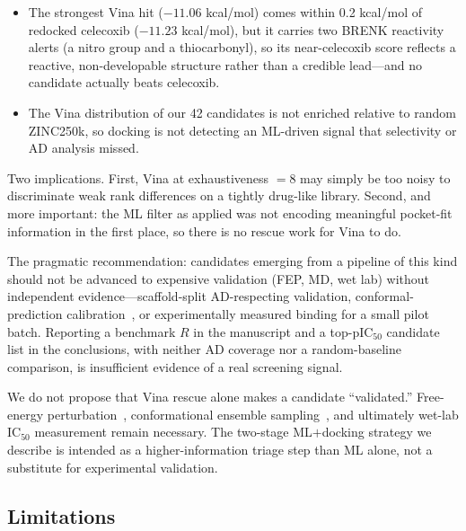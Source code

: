 \documentclass[11pt]{article}
\begin{document}
\begin{itemize}
\item The strongest Vina hit ($-11.06$ kcal/mol) comes within 0.2 kcal/mol of redocked celecoxib ($-11.23$ kcal/mol), but it carries two BRENK reactivity alerts (a nitro group and a thiocarbonyl), so its near-celecoxib score reflects a reactive, non-developable structure rather than a credible lead---and no candidate actually beats celecoxib.
\item The Vina distribution of our 42 candidates is not enriched relative to random ZINC250k, so docking is not detecting an ML-driven signal that selectivity or AD analysis missed.
\end{itemize}

Two implications. First, Vina at exhaustiveness $=8$ may simply be too noisy to discriminate weak rank differences on a tightly drug-like library. Second, and more important: the ML filter as applied was not encoding meaningful pocket-fit information in the first place, so there is no rescue work for Vina to do.

The pragmatic recommendation: candidates emerging from a pipeline of this kind should not be advanced to expensive validation (FEP, MD, wet lab) without independent evidence---scaffold-split AD-respecting validation, conformal-prediction calibration~\cite{cortes2019}, or experimentally measured binding for a small pilot batch. Reporting a benchmark $R$ in the manuscript and a top-pIC$_{50}$ candidate list in the conclusions, with neither AD coverage nor a random-baseline comparison, is insufficient evidence of a real screening signal.

We do not propose that Vina rescue alone makes a candidate ``validated.'' Free-energy perturbation~\cite{wang2015}, conformational ensemble sampling~\cite{shan2011}, and ultimately wet-lab IC$_{50}$ measurement remain necessary. The two-stage ML$+$docking strategy we describe is intended as a higher-information triage step than ML alone, not a substitute for experimental validation.

\subsection{Limitations}
\end{document}
